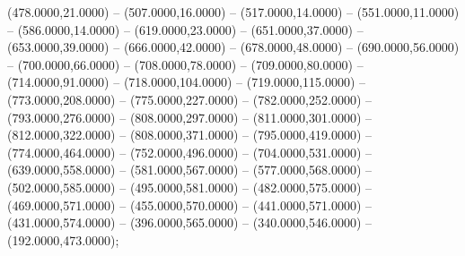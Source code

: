 \begin{scope}[shift={(-190.875,-10.875)}]
\begin{scope}[draw=black,line join=round,line width=0.208pt]
        (478.0000,21.0000) -- (507.0000,16.0000) -- (517.0000,14.0000) --
        (551.0000,11.0000) -- (586.0000,14.0000) -- (619.0000,23.0000) --
        (651.0000,37.0000) -- (653.0000,39.0000) -- (666.0000,42.0000) --
        (678.0000,48.0000) -- (690.0000,56.0000) -- (700.0000,66.0000) --
        (708.0000,78.0000) -- (709.0000,80.0000) -- (714.0000,91.0000) --
        (718.0000,104.0000) -- (719.0000,115.0000) -- (773.0000,208.0000) --
        (775.0000,227.0000) -- (782.0000,252.0000) -- (793.0000,276.0000) --
        (808.0000,297.0000) -- (811.0000,301.0000) -- (812.0000,322.0000) --
        (808.0000,371.0000) -- (795.0000,419.0000) -- (774.0000,464.0000) --
        (752.0000,496.0000) -- (704.0000,531.0000) -- (639.0000,558.0000) --
        (581.0000,567.0000) -- (577.0000,568.0000) -- (502.0000,585.0000) --
        (495.0000,581.0000) -- (482.0000,575.0000) -- (469.0000,571.0000) --
        (455.0000,570.0000) -- (441.0000,571.0000) -- (431.0000,574.0000) --
        (396.0000,565.0000) -- (340.0000,546.0000) -- (192.0000,473.0000);
  \end{scope}
\end{scope}
